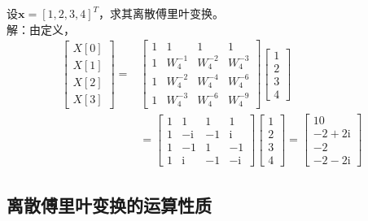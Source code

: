 \documentclass{ctexbook}
\begin{document}
\begin{example}
    设$\mathbf{x}=[1,2,3,4]^T$，求其离散傅里叶变换。\\
    解：由定义，
    \begin{align*}
        \begin{bmatrix}
            X[0]  \\
            X[1]  \\
            X[2]  \\
            X[3]
        \end{bmatrix}=&\begin{bmatrix}1 & 1 & 1 & 1 \\
        1 & W_4^{-1} & W_4^{-2} & W_4^{-3} \\
        1 & W_4^{-2} & W_4^{-4} & W_4^{-6} \\
        1 & W_4^{-3} & W_4^{-6} & W_4^{-9}
        \end{bmatrix}\begin{bmatrix}
            1  \\
            2  \\
            3  \\
            4
        \end{bmatrix}\\
        &=\begin{bmatrix}
        1 & 1 & 1 & 1 \\
        1 & -\mathrm{i} & -1 & \mathrm{i} \\
        1 & -1 & 1 & -1 \\
        1 & \mathrm{i} & -1 & -\mathrm{i}
        \end{bmatrix}\begin{bmatrix}
            1  \\
            2  \\
            3  \\
            4
        \end{bmatrix}=\begin{bmatrix}
            10  \\
            -2+2\mathrm{i}  \\
            -2  \\
            -2-2\mathrm{i}
        \end{bmatrix}
    \end{align*}
\end{example}

\subsection{离散傅里叶变换的运算性质}\label{sub:property_of_DFT}
\end{document}
